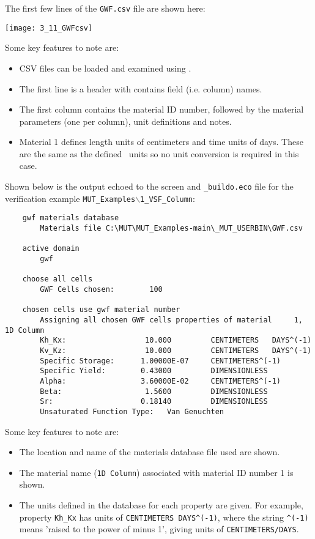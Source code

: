 {The first few lines of the \texttt{GWF.csv} file are shown here:

    \texttt{[image: 3\_11\_GWFcsv]}

Some key features to note are:
\begin{itemize}
    \item CSV files can be loaded and examined using \excel.
    \item The first line is a header with contains field (i.e. column) names.
    \item The first column contains the material ID number, followed by the material parameters (one per column), unit definitions and notes.
    \item Material 1 defines length units of centimeters and time units of days.  These are the same as the defined \mfus\ units so no unit conversion is required in this case.
\end{itemize}

Shown below is the output echoed to the screen and \texttt{\_buildo.eco} file for the verification example \texttt{MUT\_Examples$\backslash$1\_VSF\_Column}: \begin{verbatim}
    gwf materials database
        Materials file C:\MUT\MUT_Examples-main\_MUT_USERBIN\GWF.csv

    active domain
        gwf

    choose all cells
        GWF Cells chosen:        100

    chosen cells use gwf material number
        Assigning all chosen GWF cells properties of material     1, 1D Column
        Kh_Kx:                  10.000         CENTIMETERS   DAYS^(-1)
        Kv_Kz:                  10.000         CENTIMETERS   DAYS^(-1)
        Specific Storage:      1.00000E-07     CENTIMETERS^(-1)
        Specific Yield:        0.43000         DIMENSIONLESS
        Alpha:                 3.60000E-02     CENTIMETERS^(-1)
        Beta:                   1.5600         DIMENSIONLESS
        Sr:                    0.18140         DIMENSIONLESS
        Unsaturated Function Type:   Van Genuchten

\end{verbatim}
Some key features to note are:
\begin{itemize}
    \item The location and name of the materials database file used are shown.
    \item The material name (\texttt{1D Column}) associated with material ID number 1 is shown.
    \item The units defined in the database for each property are given. For example, property  \texttt{Kh\_Kx} has units of \verb+CENTIMETERS DAYS^(-1)+, where the string \verb+^(-1)+ means 'raised to the power of minus 1', giving units of \verb+CENTIMETERS/DAYS+.
\end{itemize}

}
